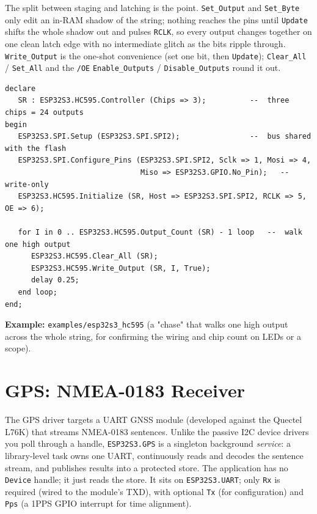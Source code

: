 The split between staging and latching is the point. \texttt{Set\_Output} and
\texttt{Set\_Byte} only edit an in-RAM shadow of the string; nothing reaches the
pins until \texttt{Update} shifts the whole shadow out and pulses \texttt{RCLK},
so every output changes together on one clean latch edge with no intermediate
glitch as the bits ripple through. \texttt{Write\_Output} is the one-shot
convenience (set one bit, then \texttt{Update}); \texttt{Clear\_All} /
\texttt{Set\_All} and the \texttt{/OE} \texttt{Enable\_Outputs} /
\texttt{Disable\_Outputs} round it out.

\begin{lstlisting}
declare
   SR : ESP32S3.HC595.Controller (Chips => 3);          --  three chips = 24 outputs
begin
   ESP32S3.SPI.Setup (ESP32S3.SPI.SPI2);                --  bus shared with the flash
   ESP32S3.SPI.Configure_Pins (ESP32S3.SPI.SPI2, Sclk => 1, Mosi => 4,
                               Miso => ESP32S3.GPIO.No_Pin);   --  write-only
   ESP32S3.HC595.Initialize (SR, Host => ESP32S3.SPI.SPI2, RCLK => 5, OE => 6);

   for I in 0 .. ESP32S3.HC595.Output_Count (SR) - 1 loop   --  walk one high output
      ESP32S3.HC595.Clear_All (SR);
      ESP32S3.HC595.Write_Output (SR, I, True);
      delay 0.25;
   end loop;
end;
\end{lstlisting}

\noindent\textbf{Example:} \texttt{examples/esp32s3\_hc595} (a "chase" that walks
one high output across the whole string, for confirming the wiring and chip count
on LEDs or a scope).

\section{GPS: NMEA-0183 Receiver}
\label{app:ext:gps}

The GPS driver targets a UART GNSS module (developed against the Quectel L76K) that
streams NMEA-0183 sentences. Unlike the passive I2C device drivers you poll through
a handle, \texttt{ESP32S3.GPS} is a singleton background \emph{service}: a
library-level task owns one UART, continuously reads and decodes the sentence
stream, and publishes results into a protected store. The application has no
\texttt{Device} handle; it just reads the store. It sits on \texttt{ESP32S3.UART};
only \texttt{Rx} is required (wired to the module's TXD), with optional \texttt{Tx}
(for configuration) and \texttt{Pps} (a 1PPS GPIO interrupt for time alignment).

